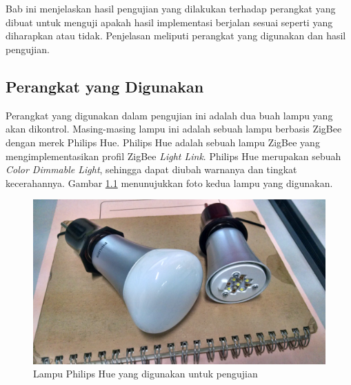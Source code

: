 \chapter{\babLima}

Bab ini menjelaskan hasil pengujian yang dilakukan terhadap perangkat yang dibuat untuk menguji apakah hasil implementasi berjalan sesuai seperti yang diharapkan atau tidak. Penjelasan meliputi perangkat yang digunakan dan hasil pengujian.

\section{Perangkat yang Digunakan}

Perangkat yang digunakan dalam pengujian ini adalah dua buah lampu yang akan dikontrol. Masing-masing lampu ini adalah sebuah lampu berbasis ZigBee dengan merek Philips Hue. Philips Hue adalah sebuah lampu ZigBee yang mengimplementasikan profil ZigBee \textit{Light Link}. Philips Hue merupakan sebuah \textit{Color Dimmable Light}, sehingga dapat diubah warnanya dan tingkat kecerahannya. Gambar \ref{fig:philips-hue} menunujukkan foto kedua lampu yang digunakan.

\begin{figure}
	\centering
	\includegraphics[width=.9\textwidth]{pics/philips-hue.jpg}
	\caption{Lampu Philips Hue yang digunakan untuk pengujian}
	\label{fig:philips-hue}
\end{figure}

